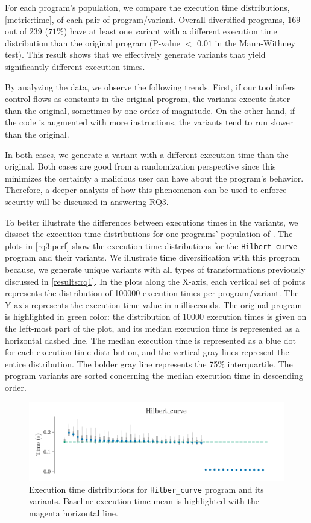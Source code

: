 For each program's population, we compare the execution time distributions, \autoref{metric:time}, of each pair of program/variant.
Overall diversified programs, $169$ out of $239$ ($71\%$) have at least one variant with a different execution time distribution than the original program (P-value $<$ $0.01$ in the Mann-Withney test). This result shows that we effectively generate variants that yield significantly different execution times.

By analyzing the data, we observe the following trends. First, if our tool infers control-flows as constants in the original program, the variants execute faster than the original, sometimes by one order of magnitude. On the other hand, if the code is augmented with more instructions, the variants tend to run slower than the original. 

In both cases, we generate a variant with a different execution time than the original. Both cases are good from a randomization perspective since this minimizes the certainty a malicious user can have about the program's behavior. Therefore, a deeper analysis of how this phenomenon can be used to enforce security will be discussed in answering RQ3.

To better illustrate the differences between executions times in the variants, we dissect the execution time distributions for one programs' population of \corpusrosetta. The plots in \autoref{rq3:perf} show the execution time distributions for the \texttt{Hilbert curve} program and their variants. 
We illustrate time diversification with this program because, we generate unique variants with all types of transformations previously discussed in \autoref{results:rq1}.
In the plots along the X-axis, each vertical set of points represents the distribution of 100000 execution times per program/variant. The Y-axis represents the execution time value in milliseconds. The original program is highlighted in green color: the distribution of 10000 execution times is given on the left-most part of the plot, and its median execution time is represented as a horizontal dashed line. The median execution time is represented as a blue dot for each execution time distribution, and the vertical gray lines represent the entire distribution. The bolder gray line represents the 75\% interquartile. The program variants are sorted concerning the median execution time in descending order.

\begin{figure}[h]
    \centering
    \includegraphics[width=\linewidth]{plots/hilbert_curve.pdf}
    \caption{Execution time distributions for \texttt{Hilber\_curve} program and its variants. Baseline execution time mean is highlighted with the magenta horizontal line. }
    \label{rq3:perf}
\end{figure}

